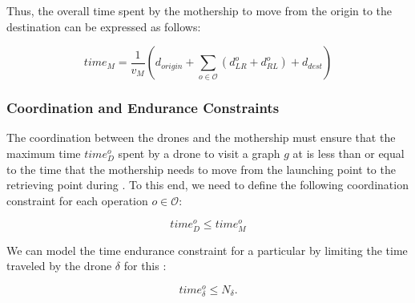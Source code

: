 \noindent
Thus, the overall time spent by the mothership to move from the origin to the destination can be expressed as follows:

\begin{equation}
time_M = \frac{1}{v_M} (d_{origin} + \sum_{o \in \mathcal O} (d_{LR}^o + d_{RL}^o) + d_{dest})%
\label{eq:NOtimeM}
\end{equation}


\subsubsection*{Coordination and Endurance Constraints}
\noindent
The coordination between the drones and the mothership must ensure that the maximum time $time_D^o$ spent by a drone to visit a graph $g$ at  is less than or equal to the time that the mothership needs to move from the launching point to the retrieving point during . To this end, we need to define the following coordination constraint for each operation $o\in \mathcal O$:

\begin{equation}\tag{DCW-CO}\label{NODCW}
time_D^o \leq time_M^o
\end{equation}



\noindent
We can model the time endurance constraint for a particular  by limiting the time traveled by the drone $\delta$ for this :

\begin{equation}\tag{Endurance-CO}\label{NOCAP}
    time_\delta^o \leq N_\delta.
\end{equation}






